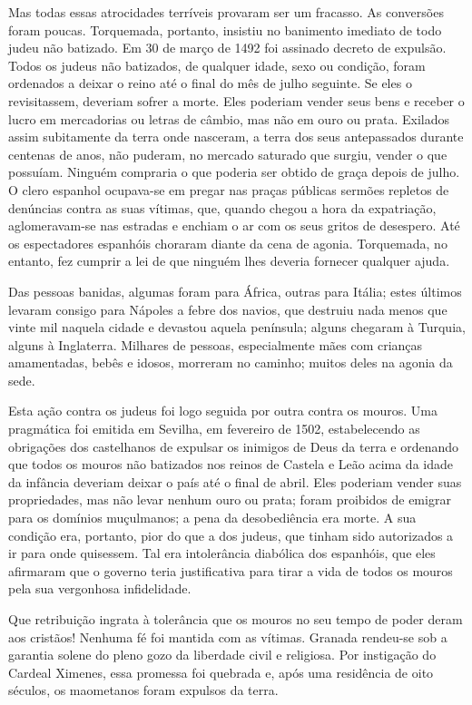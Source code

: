 \documentclass[11pt,a5paper,twoside,openany]{book}
\begin{document}
Mas todas essas atrocidades terríveis provaram ser um fracasso. As conversões foram poucas. Torquemada, portanto, insistiu no banimento imediato de todo judeu não batizado. Em 30 de março de 1492 foi assinado decreto de expulsão. Todos os judeus não batizados, de qualquer idade, sexo ou condição, foram ordenados a deixar o reino até o final do mês de julho seguinte. Se eles o revisitassem, deveriam sofrer a morte. Eles poderiam vender seus bens e receber o lucro em mercadorias ou letras de câmbio, mas não em ouro ou prata. Exilados assim subitamente da terra onde nasceram, a terra dos seus antepassados ​​durante centenas de anos, não puderam, no mercado saturado que surgiu, vender o que possuíam. Ninguém compraria o que poderia ser obtido de graça depois de julho. O clero espanhol ocupava-se em pregar nas praças públicas sermões repletos de denúncias contra as suas vítimas, que, quando chegou a hora da expatriação, aglomeravam-se nas estradas e enchiam o ar com os seus gritos de desespero. Até os espectadores espanhóis choraram diante da cena de agonia. Torquemada, no entanto, fez cumprir a lei de que ninguém lhes deveria fornecer qualquer ajuda.

Das pessoas banidas, algumas foram para África, outras para Itália; estes últimos levaram consigo para Nápoles a febre dos navios, que destruiu nada menos que vinte mil naquela cidade e devastou aquela península; alguns chegaram à Turquia, alguns à Inglaterra. Milhares de pessoas, especialmente mães com crianças amamentadas, bebês e idosos, morreram no caminho; muitos deles na agonia da sede.

Esta ação contra os judeus foi logo seguida por outra contra os mouros. Uma pragmática foi emitida em Sevilha, em fevereiro de 1502, estabelecendo as obrigações dos castelhanos de expulsar os inimigos de Deus da terra e ordenando que todos os mouros não batizados nos reinos de Castela e Leão acima da idade da infância deveriam deixar o país até o final de abril. Eles poderiam vender suas propriedades, mas não levar nenhum ouro ou prata; foram proibidos de emigrar para os domínios muçulmanos; a pena da desobediência era morte. A sua condição era, portanto, pior do que a dos judeus, que tinham sido autorizados a ir para onde quisessem. Tal era intolerância diabólica dos espanhóis, que eles afirmaram que o governo teria justificativa para tirar a vida de todos os mouros pela sua vergonhosa infidelidade.

Que retribuição ingrata à tolerância que os mouros no seu tempo de poder deram aos cristãos! Nenhuma fé foi mantida com as vítimas. Granada rendeu-se sob a garantia solene do pleno gozo da liberdade civil e religiosa. Por instigação do Cardeal Ximenes, essa promessa foi quebrada e, após uma residência de oito séculos, os maometanos foram expulsos da terra.
\end{document}
